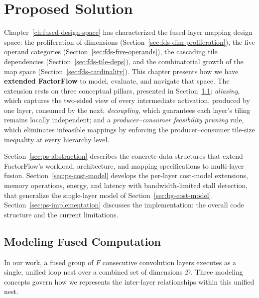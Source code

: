 \chapter{Proposed Solution}
\label{ch:proposed-solution}


Chapter~\ref{ch:fused-design-space} has characterized the fused-layer
mapping design space: the proliferation of dimensions
(Section~\ref{sec:fds-dim-proliferation}), the five operand categories
(Section~\ref{sec:fds-five-operands}), the cascading tile dependencies
(Section~\ref{sec:fds-tile-deps}), and the combinatorial growth of the
map space
(Section~\ref{sec:fds-cardinality}).
This chapter presents how we have \textbf{extended FactorFlow} to model,
evaluate, and navigate that space.
The extension rests on three conceptual pillars, presented in
Section~\ref{sec:ps-modeling}:
\emph{aliasing}, which captures the two-sided view of every
intermediate activation, produced by one layer, consumed by the next;
\emph{decoupling}, which guarantees each layer's tiling remains locally independent; and a
\emph{producer--consumer feasibility pruning} rule, which eliminates
infeasible mappings by enforcing the producer--consumer tile-size
inequality at every hierarchy level.

Section~\ref{sec:ps-abstraction} describes the concrete data structures
that extend FactorFlow's workload, architecture, and mapping
specifications to multi-layer fusion.
Section~\ref{sec:ps-cost-model} develops the per-layer cost-model
extensions, memory operations, energy, and latency with
bandwidth-limited stall detection, that generalize the single-layer
model of Section~\ref{sec:bg-cost-model}.
Section~\ref{sec:ps-implementation} discusses the implementation: the
overall code structure and
the current limitations.


\section{Modeling Fused Computation}
\label{sec:ps-modeling}

In our work, a fused group of $F$ consecutive convolution layers executes as a
single, unified loop nest over a combined set of dimensions
$\mathcal{D}$.
Three modeling concepts govern how we represents the
inter-layer relationships within this unified nest.

